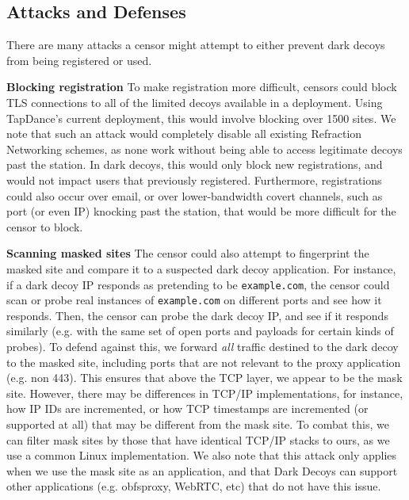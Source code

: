 \documentclass[letterpaper,twocolumn,10pt]{article}
\renewcommand{\paragraph}[1]{\smallskip\noindent\textbf{#1\quad}}
\begin{document}
\TabCompare

\subsection{Attacks and Defenses}

There are many attacks a censor might attempt to either prevent dark decoys from
being registered or used.

\paragraph{Blocking registration}
To make registration more difficult, censors could block TLS connections to all of the
limited decoys available in a deployment. Using TapDance's current deployment,
this would involve blocking over 1500 sites. We note that such an attack would
completely disable all existing Refraction Networking schemes, as none work
without being able to access legitimate decoys past the station. In dark decoys,
this would only block new registrations, and would not impact users that
previously registered. Furthermore, registrations could also occur over email,
or over lower-bandwidth covert channels, such as port (or even IP) knocking past
the station, that would be more difficult for the censor to block.

\paragraph{Scanning masked sites}
The censor could also attempt to fingerprint the masked site and compare it to a
suspected dark decoy application. For instance, if a dark decoy IP responds as
pretending to be \texttt{example.com}, the censor could scan or probe real instances
of \texttt{example.com} on different ports and see how it responds. Then, the
censor can probe the dark decoy IP, and see if it responds similarly (e.g. with
the same set of open ports and payloads for certain kinds of probes). To defend
against this, we forward \emph{all} traffic destined to the dark decoy to the
masked site, including ports that are not relevant to the proxy application
(e.g. non 443). This ensures that above the TCP layer, we appear to be the mask
site. However, there may be differences in TCP/IP implementations, for instance,
how IP IDs are incremented, or how TCP timestamps are incremented (or supported
at all) that may be different from the mask site. To combat this, we can filter
mask sites by those that have identical TCP/IP stacks to ours, as we use a
common Linux implementation. We also note that this attack only applies when we
use the mask site as an application, and that Dark Decoys can support other
applications (e.g. obfsproxy, WebRTC, etc) that do not have this issue.
\end{document}

